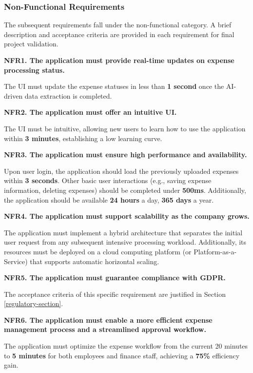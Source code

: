 \subsubsection{Non-Functional Requirements}
\label{sec:non-functional-requirements}

The subsequent requirements fall under the non-functional category. A brief description and acceptance criteria are provided in each requirement for final project validation.

\textbf{NFR1. The application must provide real-time updates on expense processing status.}

The UI must update the expense statuses in less than \textbf{1 second} once the AI-driven data extraction is completed. 

\textbf{NFR2. The application must offer an intuitive UI.}

The UI must be intuitive, allowing new users to learn how to use the application within \textbf{3 minutes}, establishing a low learning curve.

\textbf{NFR3. The application must ensure high performance and availability.}

Upon user login, the application should load the previously uploaded expenses within \textbf{3 seconds}. Other basic user interactions (e.g., saving expense information, deleting expenses) should be completed under \textbf{500ms}. Additionally, the application should be available \textbf{24 hours} a day, \textbf{365 days} a year.

\textbf{NFR4. The application must support scalability as the company grows.}

The application must implement a hybrid architecture that separates the initial user request from any subsequent intensive processing workload. Additionally, its resources must be deployed on a cloud computing platform (or Platform-as-a-Service) that supports automatic horizontal scaling.

\textbf{NFR5.  The application must guarantee compliance with GDPR.}

The acceptance criteria of this specific requirement are justified in Section \ref{regulatory-section}.

\textbf{NFR6. The application must enable a more efficient expense management process and a streamlined approval workflow.}

The application must optimize the expense workflow from the current 20 minutes to \textbf{5 minutes} for both employees and finance staff, achieving a \textbf{75\%} efficiency gain.

